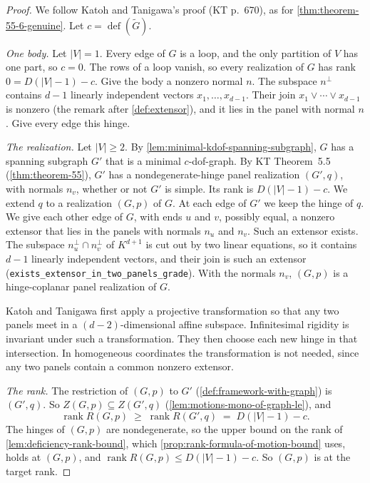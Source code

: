 \begin{proof}
  \leanok
  We follow Katoh and Tanigawa's proof (KT p.~670), as for
  \cref{thm:theorem-55-6-genuine}. Let $c = \operatorname{def}(\tilde G)$.

  \emph{One body.} Let $|V| = 1$. Every edge of $G$ is a loop, and the
  only partition of $V$ has one part, so $c = 0$. The rows of a loop
  vanish, so every realization of $G$ has rank $0 = D(|V| - 1) - c$.
  Give the body a nonzero normal $n$. The subspace $n^\perp$ contains
  $d - 1$ linearly independent vectors $x_1, \dots, x_{d-1}$. Their join
  $x_1 \vee \cdots \vee x_{d-1}$ is nonzero (the remark after
  \cref{def:extensor}), and it lies in the panel with normal $n$. Give
  every edge this hinge.

  \emph{The realization.} Let $|V| \ge 2$. By
  \cref{lem:minimal-kdof-spanning-subgraph}, $G$ has a spanning subgraph
  $G'$ that is a minimal $c$-dof-graph. By KT Theorem~5.5
  (\cref{thm:theorem-55}), $G'$ has a nondegenerate-hinge panel
  realization $(G', q)$, with normals $n_v$, whether or not $G'$ is
  simple. Its rank is $D(|V| - 1) - c$. We extend $q$ to a realization
  $(G, p)$ of $G$. At each edge of $G'$ we keep the hinge of $q$. We
  give each other edge of $G$, with ends $u$ and $v$, possibly equal, a
  nonzero extensor that lies in the panels with normals $n_u$ and $n_v$.
  Such an extensor exists. The subspace $n_u^\perp \cap n_v^\perp$ of
  $K^{d+1}$ is cut out by two linear equations, so it contains $d - 1$
  linearly independent vectors, and their join is such an extensor
  (\texttt{exists\_\allowbreak{}extensor\_\allowbreak{}in\_\allowbreak{}two\_\allowbreak{}panels\_\allowbreak{}grade}).
  With the normals $n_v$, $(G, p)$ is a hinge-coplanar panel realization
  of $G$.

  Katoh and Tanigawa first apply a projective transformation so that any
  two panels meet in a $(d-2)$-dimensional affine subspace.
  Infinitesimal rigidity is invariant under such a transformation. They
  then choose each new hinge in that intersection. In homogeneous
  coordinates the transformation is not needed, since any two panels
  contain a common nonzero extensor.

  \emph{The rank.} The restriction of $(G, p)$ to $G'$
  (\cref{def:framework-with-graph}) is $(G', q)$. So
  $Z(G, p) \subseteq Z(G', q)$ (\cref{lem:motions-mono-of-graph-le}),
  and
  \[
    \operatorname{rank} R(G, p) \;\ge\; \operatorname{rank} R(G', q)
    \;=\; D(|V| - 1) - c.
  \]
  The hinges of $(G, p)$ are nondegenerate, so the upper bound on the
  rank of \cref{lem:deficiency-rank-bound}, which
  \cref{prop:rank-formula-of-motion-bound} uses, holds at $(G, p)$, and
  $\operatorname{rank} R(G, p) \le D(|V| - 1) - c$. So $(G, p)$ is at the
  target rank.
\end{proof}

